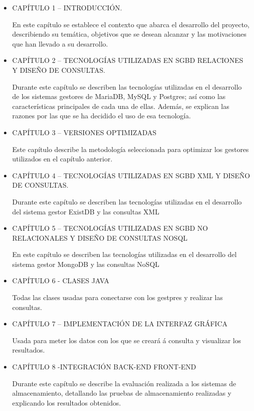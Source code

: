 \documentclass[12pt,a4paper]{article}
\begin{document}
\begin{itemize}
\item CAPÍTULO 1 – INTRODUCCIÓN. 

En este capítulo se establece el contexto que abarca el desarrollo del proyecto, describiendo su temática, objetivos que se desean alcanzar y las motivaciones que han llevado a su desarrollo. 

\item CAPÍTULO 2 – TECNOLOGÍAS UTILIZADAS EN SGBD RELACIONES Y DISEÑO DE CONSULTAS. 

Durante este capítulo se describen las tecnologías utilizadas en el desarrollo de los sistemas gestores de MariaDB, MySQL y Postgres; así como las características principales de cada una de ellas. Además, se explican las razones por las que se ha decidido el uso de esa tecnología. 

\item CAPÍTULO 3 – VERSIONES OPTIMIZADAS  

Este capítulo describe la metodología seleccionada para optimizar los gestores utilizados en el capítulo anterior.

\item CAPÍTULO 4 – TECNOLOGÍAS UTILIZADAS EN SGBD XML Y DISEÑO DE CONSULTAS. 

Durante este capítulo se describen las tecnologías utilizadas en el desarrollo del sistema gestor ExistDB y las consultas XML

\item  CAPÍTULO 5 – TECNOLOGÍAS UTILIZADAS EN SGBD NO RELACIONALES Y DISEÑO DE CONSULTAS NOSQL

En este capítulo se describen las tecnologías utilizadas en el desarrollo del sistema gestor MongoDB y las consultas NoSQL

\item CAPÍTULO 6 - CLASES JAVA

Todas las clases usadas para conectarse con los gestpres y realizar las consultas.

\item CAPÍTULO 7 – IMPLEMENTACIÓN DE LA INTERFAZ GRÁFICA 

Usada para meter los datos con los que se creará á consulta y visualizar los resultados.

\item CAPÍTULO 8 -INTEGRACIÓN BACK-END FRONT-END

Durante este capítulo se describe la evaluación realizada a los sistemas de almacenamiento, detallando las pruebas de almacenamiento realizadas y explicando los resultados obtenidos.


\end{itemize}
\end{document}
